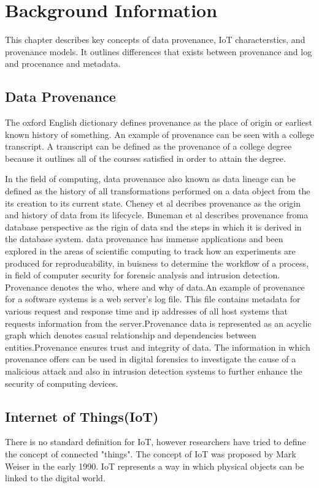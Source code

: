 
\chapter{Background Information}

This chapter describes key concepts of data provenance, IoT characterstics, and provenance models. It outlines differences that exists between provenance and log and procenance and metadata. 

\section{Data Provenance}

The oxford English dictionary defines provenance as the place of origin or earliest known history of something. An example of provenance can be seen with a college transcript. A transcript can be defined as the provenance of a college degree because it outlines all of the courses satisfied in order to attain the degree.
\par In the field of computing, data provenance also known as data lineage can be defined as the history of all transformations performed on a data object from the its creation to its current state. Cheney et al decribes provenance as the origin and history of data from its lifecycle. Buneman et al describes provenance froma database perspective as the rigin of data snd the steps in which it is derived in the database system. data provenance has immense applications and been explored in the areas of scientific computing to track how an experiments are produced for reproducability, in buisness to determine the workflow of  a process, in field of computer security for forensic analysis and intrusion detection. Provenance denotes the who, where and why of data.An example of provenance for a software systems is a web server's log file. This file contains metadata for various request and response time and ip addresses of all host systems that requests information from the server.Provenance data is represented as an acyclic graph which denotes casual relationship and dependencies between entities.Provenance ensures trust and integrity of data. The information in which provenance offers can be used in digital forensics to investigate the cause of a malicious attack and also in intrusion detection systems to further enhance the security of computing devices. 




 
\section{Internet of Things(IoT)}
There is no standard definition for IoT, however researchers have tried to define the concept of connected "things". The concept of IoT was proposed by Mark Weiser in the early 1990.  IoT represents a way in which physical objects can be linked to the digital world.



